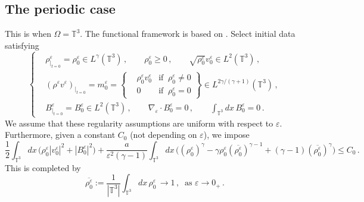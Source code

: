 \documentclass[11pt,reqno]{amsart}
\def \T{{\mathbb{T}}}
\begin{document}

\subsection{The periodic case}
\label{ss:rT3} This is when $\Omega=\T^3$. The functional framework is based on \cite{HW10,LM98}. Select initial data satisfying
\begin{equation}
  \label{reg-ic-mhdeps-P}
   \left\{
   \begin{aligned}
     & \rho^\varepsilon_{|_{t=0}}=\rho_0^\varepsilon\in L^\gamma(\T^3)\,, \qquad  \rho_0^\varepsilon \geq 0\,,
     \qquad \sqrt{\rho_0^\varepsilon} v_0^\varepsilon \in L^2(\T^3)\,, \\
     &(\rho^\varepsilon v^\varepsilon)_{|_{t=0}} = m_0^\varepsilon =
     \left\{
     \begin{aligned}
       & \rho_0^\varepsilon v_0^\varepsilon & \mbox{if } \ \rho_0^\varepsilon\neq 0\\
       & 0  & \mbox{if }\ \rho_0^\varepsilon= 0
     \end{aligned}
     \right\}
     \in L^{2\gamma/(\gamma+1)}(\T^3)\,, \\
     & B^\varepsilon_{|_{t=0}}=B_0^\varepsilon \in L^2(\T^3)\, , \qquad \nabla_\varepsilon \cdot B_0^\varepsilon=0 \, , \qquad  \int_{\T^3} dx \, B_0^\varepsilon=0 \, .
   \end{aligned}
  \right.
\end{equation}
We assume that these regularity assumptions are uniform with respect to $\varepsilon$. Furthermore, given a constant $ C_0 $ (not depending on $ \varepsilon $), we impose
\begin{equation}
  \label{ineqC0-P}
 \frac 12 \int_{\T^3} dx\, \big( \rho_0^\varepsilon |v_0^\varepsilon|^2 + |B_0^\varepsilon|^2\big) + \frac{a}{\varepsilon^2(\gamma-1)}
   \int_{\T^3} dx\, \big( (\rho_0^\varepsilon)^\gamma - \gamma  \rho_0^\varepsilon (\overline{\rho^\varepsilon_0})^{\gamma-1}
   + (\gamma -1)(\overline{\rho^\varepsilon_0})^{\gamma}\big) \leq C_0 \, .
\end{equation}
This is completed by
\begin{equation}
  \label{ineqC0-P++}
\overline{\rho_0^\varepsilon} := \frac{1}{|\T^3|} \int_{\T^3} dx\,\rho_0^\varepsilon \, \xrightarrow{\quad} 1\,, \ \mbox{ as } \varepsilon \xrightarrow{\quad} 0_+\,.   
\end{equation}
\end{document}
